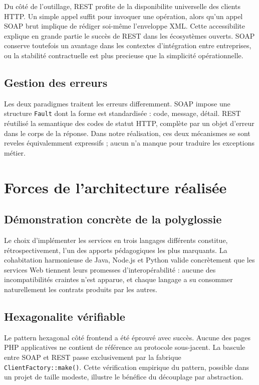 Du côté de l'outillage, REST profite de la disponibilite universelle des clients HTTP. Un simple appel  suffit pour invoquer une opération, alors qu'un appel SOAP brut implique de rédiger soi-même l'enveloppe XML. Cette accessibilite explique en grande partie le succès de REST dans les écosystèmes ouverts. SOAP conserve toutefois un avantage dans les contextes d'intégration entre entreprises, ou la stabilité contractuelle est plus precieuse que la simplicité opérationnelle.

\subsection{Gestion des erreurs}

Les deux paradigmes traitent les erreurs differemment. SOAP impose une structure \texttt{Fault} dont la forme est standardisée : code, message, détail. REST réutilisé la semantique des codes de statut HTTP, complète par un objet d'erreur dans le corps de la réponse. Dans notre réalisation, ces deux mécanismes se sont reveles équivalemment expressifs ; aucun n'a manque pour traduire les exceptions métier.

\section{Forces de l'architecture réalisée}

\subsection{Démonstration concrète de la polyglossie}

Le choix d'implémenter les services en trois langages différents constitue, rétrospectivement, l'un des apports pédagogiques les plus marquants. La cohabitation harmonieuse de Java, Node.js et Python valide concrètement que les services Web tiennent leurs promesses d'interopérabilité : aucune des incompatibilités craintes n'est apparue, et chaque langage a su consommer naturellement les contrats produits par les autres.

\subsection{Hexagonalite vérifiable}

Le pattern hexagonal côté frontend a été éprouvé avec succès. Aucune des pages PHP applicatives ne contient de référence au protocole sous-jacent. La bascule entre SOAP et REST passe exclusivement par la fabrique \texttt{ClientFactory::make()}. Cette vérification empirique du pattern, possible dans un projet de taille modeste, illustre le bénéfice du découplage par abstraction.

